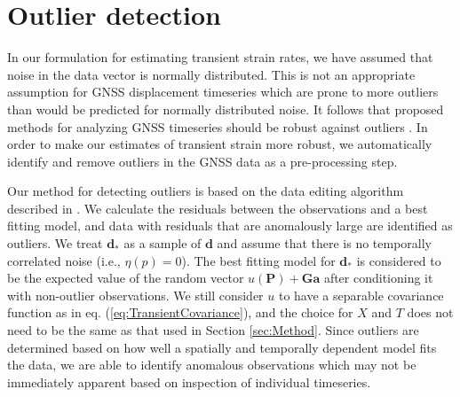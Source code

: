 \documentclass[10pt,letter]{article}
\begin{document}
\section{Outlier detection}\label{sec:Outlier}
In our formulation for estimating transient strain rates, we have assumed that noise in the data vector is normally distributed. This is not an appropriate assumption for GNSS displacement timeseries which are prone to more outliers than would be predicted for normally distributed noise. It follows that proposed methods for analyzing GNSS timeseries should be robust against outliers \citep[e.g.,][]{Blewitt2016}. In order to make our estimates of transient strain more robust, we automatically identify and remove outliers in the GNSS data as a pre-processing step.

Our method for detecting outliers is based on the data editing algorithm described in \citet{Gibbs2011}. We calculate the residuals between the observations and a best fitting model, and data with residuals that are anomalously large are identified as outliers. We treat $\bm{d}_*$ as a sample of $\bm{d}$ and assume that there is no temporally correlated noise (i.e., $\eta(p) = 0$).  The best fitting model for $\bm{d}_*$ is considered to be the expected value of the random vector $u(\bm{P}) + \bm{G}\bm{a}$ after conditioning it with non-outlier observations.  We still consider $u$ to have a separable covariance function as in eq. (\ref{eq:TransientCovariance}), and the choice for $X$ and $T$ does not need to be the same as that used in Section \ref{sec:Method}. Since outliers are determined based on how well a spatially and temporally dependent model fits the data, we are able to identify anomalous observations which may not be immediately apparent based on inspection of individual timeseries. 
\end{document}
